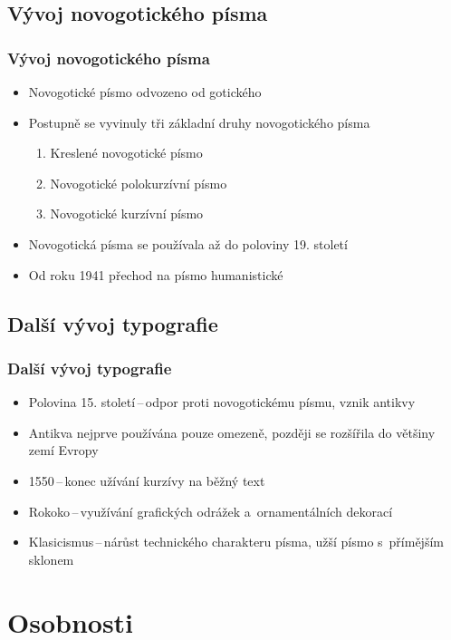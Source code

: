 \documentclass{beamer}
\begin{document}
\subsection{Vývoj novogotického písma}
\begin{frame}\frametitle{Vývoj novogotického písma}
\begin{itemize}
\item Novogotické písmo odvozeno od gotického \pause
\item Postupně se vyvinuly tři základní druhy novogotického písma \pause
\begin{enumerate}
\item{Kreslené novogotické písmo} \pause
\item{Novogotické polokurzívní písmo} \pause
\item{Novogotické kurzívní písmo} \pause
\end{enumerate}
\item Novogotická písma se používala až do poloviny 19. století \pause
\item Od roku 1941 přechod na písmo humanistické
\end{itemize} 
\end{frame}

\subsection{Další vývoj typografie}
\begin{frame}\frametitle{Další vývoj typografie}
\begin{itemize}
\item Polovina 15. století\,--\,odpor proti novogotickému písmu, vznik antikvy \pause
\item Antikva nejprve používána pouze omezeně, později se rozšířila do většiny zemí Evropy \pause
\item 1550\,--\,konec užívání kurzívy na běžný text \pause
\item Rokoko\,--\,využívání grafických odrážek a~ornamentálních dekorací \pause
\item{Klasicismus\,--\,nárůst technického charakteru písma, užší písmo s~přímějším sklonem}
\end{itemize} 
\end{frame}


\section{Osobnosti}
\end{document}
